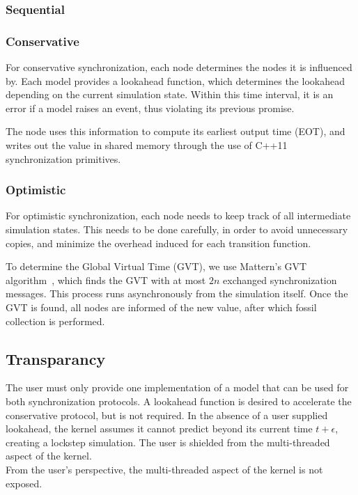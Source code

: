 \subsubsection{Sequential}

\subsubsection{Conservative}
For conservative synchronization, each node determines the nodes it is influenced by.
Each model provides a lookahead function, which determines the lookahead depending on the current simulation state.
Within this time interval, it is an error if a model raises an event, thus violating its previous promise.

The node uses this information to compute its earliest output time (EOT), and writes out the value in shared memory through the use of C++11 synchronization primitives.

\subsubsection{Optimistic}
For optimistic synchronization, each node needs to keep track of all intermediate simulation states.
This needs to be done carefully, in order to avoid unnecessary copies, and minimize the overhead induced for each transition function.

To determine the Global Virtual Time (GVT), we use Mattern's GVT algorithm~\cite{mattern}, which finds the GVT with at most $2n$ exchanged synchronization messages.
This process runs asynchronously from the simulation itself.
Once the GVT is found, all nodes are informed of the new value, after which fossil collection is performed.

\subsection{Transparancy}

The user must only provide one implementation of a model that can be used for both synchronization protocols. A lookahead function is desired to accelerate the conservative protocol, but is not required. In the absence of a user supplied lookahead, the kernel assumes it cannot predict beyond its current time $t+\epsilon$, creating a lockstep simulation. %
The user is shielded from the multi-threaded aspect of the kernel.\\
From the user's perspective, the multi-threaded aspect of the kernel is not exposed. %


